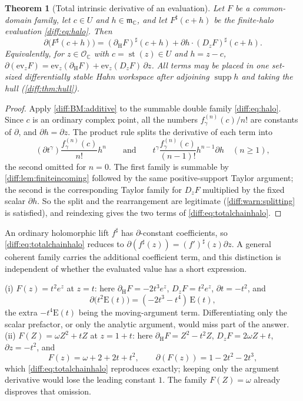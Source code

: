 \documentclass[11pt,letterpaper]{article}
\numberwithin{equation}{section}
\newtheorem{theorem}{Theorem}[section]
\theoremstyle{definition}
\theoremstyle{remark}
\newcommand{\C}{\mathbb C}
\newcommand{\der}{\partial}
\newcommand{\Ofin}{\mathcal O}
\newcommand{\mm}{\mathfrak m}
\newcommand{\st}{\operatorname{st}}
\newcommand{\supp}{\operatorname{supp}}
\newcommand{\Emm}{\mathrm{E}}
\newcommand{\dercoef}{\der_{\mathrm H}}
\newcommand{\Dz}{D_{z}}
\begin{document}
\begin{theorem}[Total intrinsic derivative of an evaluation]
\label{diff:thm:totalchainhalo}
Let $F$ be a common-domain family, let $c\in U$ and $h\in\mm_{\C}$, and let
$F^{\sharp}(c+h)$ be the finite-halo evaluation \cref{diff:eq:halo}. Then
\begin{equation}\label{diff:eq:totalchainhalo}
 \der\bigl(F^{\sharp}(c+h)\bigr)
 =(\dercoef F)^{\sharp}(c+h)
 +\der h\cdot(\Dz F)^{\sharp}(c+h).
\end{equation}
Equivalently, for $z\in\Ofin_{\C}$ with $c=\st(z)\in U$ and $h=z-c$,
$\der(\mathrm{ev}_{z}F)=\mathrm{ev}_{z}(\dercoef F)
+\mathrm{ev}_{z}(\Dz F)\,\der z$. All terms may be placed in one set-sized
differentially stable Hahn workspace after adjoining $\supp h$ and taking the
hull (\cref{diff:thm:hull}).
\end{theorem}
\begin{proof}
Apply \ref{diff:BM:additive} to the summable double family
\cref{diff:eq:halo}. Since $c$ is an ordinary complex point, all the numbers
$f_{\gamma}^{(n)}(c)/n!$ are constants of $\der$, and $\der h=\der z$. The
product rule splits the derivative of each term into
\[
 (\der t^{\gamma})\frac{f_{\gamma}^{(n)}(c)}{n!}h^{n}
 \qquad\text{and}\qquad
 t^{\gamma}\frac{f_{\gamma}^{(n)}(c)}{(n-1)!}h^{n-1}\der h
 \quad(n\geq1),
\]
the second omitted for $n=0$. The first family is summable by
\cref{diff:lem:finiteincoming} followed by the same positive-support Taylor
argument; the second is the corresponding Taylor family for $\Dz F$ multiplied
by the fixed scalar $\der h$. So the split and the rearrangement are
legitimate (\cref{diff:warn:splitting} is satisfied), and reindexing gives the
two terms of \cref{diff:eq:totalchainhalo}.
\end{proof}

An ordinary holomorphic lift $f^{\sharp}$ has $\der$-constant coefficients, so
\cref{diff:eq:totalchainhalo} reduces to
$\der(f^{\sharp}(z))=(f')^{\sharp}(z)\der z$. A general coherent family carries
the additional coefficient term, and this distinction is independent of
whether the evaluated value has a short expression.

\begin{example}
\label{diff:ex:totalhalo}
(i) $F(z)=t^{2}e^{z}$ at $z=t$: here $\dercoef F=-2t^{3}e^{z}$,
$\Dz F=t^{2}e^{z}$, $\der t=-t^{2}$, and
\[
 \der\bigl(t^{2}\Emm(t)\bigr)=(-2t^{3}-t^{4})\,\Emm(t),
\]
the extra $-t^{4}\Emm(t)$ being the moving-argument term. Differentiating only
the scalar prefactor, or only the analytic argument, would miss part of the
answer.
(ii) $F(Z)=\omega Z^{2}+tZ$ at $z=1+t$: here $\dercoef F=Z^{2}-t^{2}Z$,
$\Dz F=2\omega Z+t$, $\der z=-t^{2}$, and
\[
 F(z)=\omega+2+2t+t^{2},
 \qquad
 \der(F(z))=1-2t^{2}-2t^{3},
\]
which \cref{diff:eq:totalchainhalo} reproduces exactly; keeping only the
argument derivative would lose the leading constant $1$. The family
$F(Z)=\omega$ already disproves that omission.
\end{example}
\end{document}

